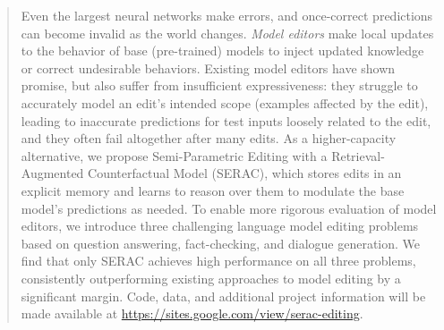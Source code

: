 \documentclass{article}
\begin{document}

\printAffiliationsAndNotice{}  %


\begin{abstract}

Even the largest neural networks make errors, and once-correct predictions can become invalid as the world changes. \textit{Model editors} make local updates to the behavior of base (pre-trained) models to inject updated knowledge or correct undesirable behaviors. Existing model editors have shown promise, but also suffer from insufficient expressiveness: they struggle to accurately model an edit's intended scope (examples affected by the edit), leading to inaccurate predictions for test inputs loosely related to the edit, and they often fail altogether after many edits. As a higher-capacity alternative, we propose Semi-Parametric Editing with a Retrieval-Augmented Counterfactual Model (SERAC), which stores edits in an explicit memory and learns to reason over them to modulate the base model's predictions as needed. To enable more rigorous evaluation of model editors, we introduce three challenging language model editing problems based on question answering, fact-checking, and dialogue generation. We find that only SERAC achieves high performance on all three problems, consistently outperforming existing approaches to model editing by a significant margin. Code, data, and additional project information will be made available at \href{https://sites.google.com/view/serac-editing}{https://sites.google.com/view/serac-editing}.

\end{abstract}
\end{document}
